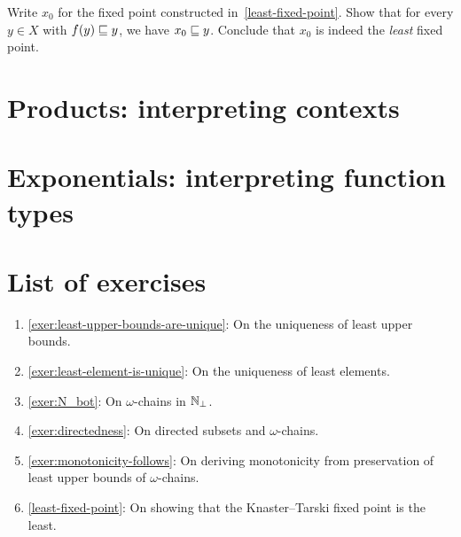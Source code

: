 \begin{exercise}\label{exer:least-fixed-point}
  Write \(x_0\) for the fixed point constructed in~\cref{least-fixed-point}.
  Show that for every \(y \in X\) with \(f(y) \sqsubseteq y\), we have \(x_0 \sqsubseteq y\).
  Conclude that \(x_0\) is indeed the \emph{least} fixed point.
\end{exercise}


\section{Products: interpreting contexts}

\section{Exponentials: interpreting function types}


\section{List of exercises}
\begin{enumerate}
\item \cref{exer:least-upper-bounds-are-unique}: On the uniqueness of least upper bounds.
\item \cref{exer:least-element-is-unique}: On the uniqueness of least elements.
\item \cref{exer:N_bot}: On \(\omega\)-chains in \(\mathbb N_\bot\).
\item \cref{exer:directedness}: On directed subsets and \(\omega\)-chains.
\item \cref{exer:monotonicity-follows}: On deriving monotonicity from preservation of
  least upper bounds of \(\omega\)-chains.
\item \cref{least-fixed-point}: On showing that the Knaster--Tarski fixed point
  is the least.
\end{enumerate}

